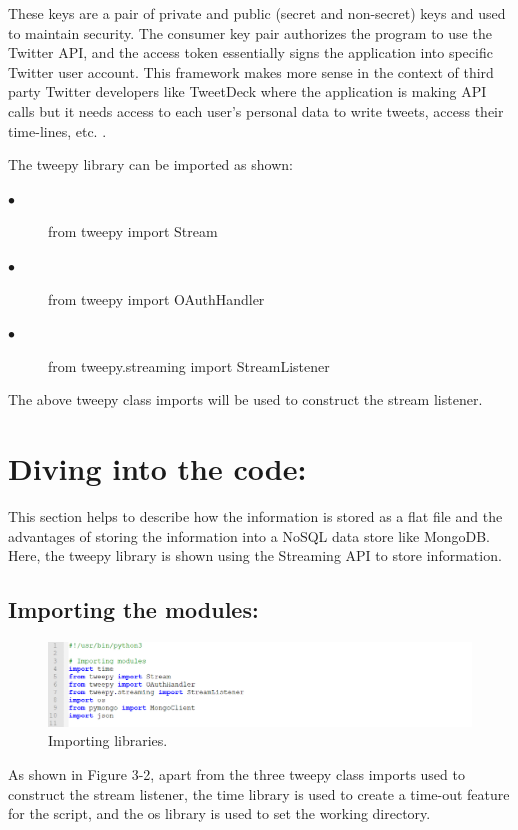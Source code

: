 These keys are a pair of private and public (secret and non-secret) keys and used to maintain security. The consumer key pair authorizes the program to use the Twitter API, and the access token essentially signs the application into specific Twitter user account. This framework makes more sense in the context of third party Twitter developers like TweetDeck where the application is making API calls but it needs access to each user's personal data to write tweets, access their time-lines, etc. \cite{collectingtwitter}.

The tweepy library can be imported as shown:

\begin{description}
\item[$\bullet$]from tweepy import Stream

\item[$\bullet$]from tweepy import OAuthHandler

\item[$\bullet$]from tweepy.streaming import StreamListener
\end{description}

The above tweepy class imports will be used to construct the stream listener.


\section{Diving into the code:}

This section helps to describe how the information is stored as a flat file and the advantages of storing the information into a NoSQL data store like MongoDB. Here, the tweepy library is shown using the Streaming API to store information.

\subsection{Importing the modules:}

\begin{figure}[ht!]
	\centering
	\includegraphics[width=150mm]{code11.png}
	\caption{Importing libraries. \label{overflow}}
\end{figure}

As shown in Figure 3-2, apart from the three tweepy class imports used to construct the stream listener, the time library is used to create a time-out feature for the script, and the os library is used to set the working directory.

